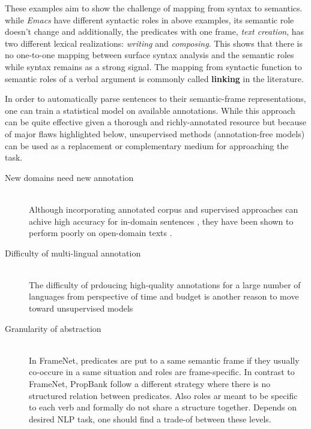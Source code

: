 These examples aim to show the challenge of mapping from syntax to semantics.
while \emph{Emacs} have different syntactic roles in above examples, its
semantic role doesn't change and additionally, the predicates with one frame,
\emph{text creation}, has two different lexical realizations: \emph{writing} and
\emph{composing}.
This shows that there is no one-to-one mapping between surface syntax analysis and the semantic roles while syntax remains as a strong signal. The mapping
from syntactic function to semantic roles of a verbal argument is commonly 
called \textbf{linking} in the literature.
\cite{Grenager2006,Lang2011a,Lang2011b}
   
In order to automatically parse sentences to their semantic-frame
representations, one can train a statistical model on available annotations.
While this approach can be quite effective given a thorough and richly-annotated
resource but because of major flaws highlighted below, unsupervised methods
(annotation-free models) can be used as a replacement or complementary medium
for approaching the task.

\begin{description}
\item[New domains need new annotation] \hfil \\ Although incorporating
annotated corpus and supervised approaches can achive high accuracy for in-domain sentences 
\cite{Punyakanok2008,Marquez2008}, they have been
shown to perform poorly on open-domain texts \cite{Pradhan2008}.
\item[Difficulty of multi-lingual annotation] \hfil \\ The difficulty
of prdoucing high-quality annotations for a large number of languages from
perspective of time and budget is another reason to move toward unsupervised
models
\item[Granularity of abstraction] \hfil \\ In FrameNet, predicates are put to a
same semantic frame if they usually co-occure in a same situation and roles are
frame-specific. In contrast to FrameNet, PropBank follow a different strategy
where there is no structured relation between predicates. Also roles ar meant to
be specific to each verb and formally do not share a structure together. Depends
on desired NLP task, one should find a trade-of between these levels.

\end{description}


